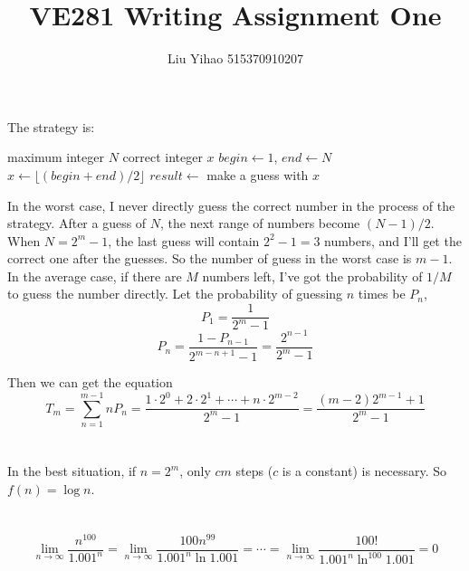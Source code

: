 \documentclass{article}
\title{VE281 Writing Assignment One}
\author{Liu Yihao 515370910207}
\date{}
\begin{document}
\maketitle

\section{}
The strategy is:
\begin{algorithm}[H]
    \begin{algorithmic}
        \Require maximum integer $N$
        \Ensure correct integer $x$
        \State $begin\gets1$, $end\gets N$
        		\State $x\gets\lfloor(begin+end)/2\rfloor$
        		\State $result\gets$ make a guess with $x$
        		\EndIf
        \EndWhile
    \end{algorithmic}  
\end{algorithm}

In the worst case, I never directly guess the correct number in the process of the strategy. After a guess of $N$, the next range of numbers become $(N-1)/2$. When $N=2^m-1$, the last guess will contain $2^2-1=3$ numbers, and I'll get the correct one after the guesses. So the number of guess in the worst case is $m-1$. \\

In the average case, if there are $M$ numbers left, I've got the probability of $1/M$ to guess the number directly. Let the probability of guessing $n$ times be $P_n$,
$$P_1=\frac{1}{2^m-1}$$ 
$$P_n=\frac{1-P_{n-1}}{2^{m-n+1}-1}=\frac{2^{n-1}}{2^{m}-1}$$ 

Then we can get the equation
$$T_m =\sum_{n=1}^{m-1}nP_n=\frac{1\cdot2^0+2\cdot2^1+\cdots+n\cdot2^{m-2}}{2^{m}-1}=\frac{(m-2)2^{m-1}+1}{2^m-1}$$

\section{}
In the best situation, if $n=2^m$, only $cm$ steps ($c$ is a constant) is necessary. So $f(n)=\log n$.

\section{}
$$\lim_{n\to\infty}\frac{n^{100}}{1.001^n}=\lim_{n\to\infty}\frac{100n^{99}}{1.001^n\ln1.001}=\cdots=\lim_{n\to\infty}\frac{100!}{1.001^n\ln^{100}1.001}=0$$
\end{document}
